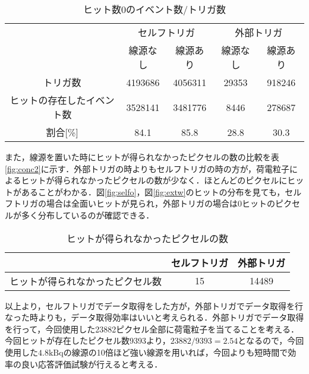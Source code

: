 \begin{table}[h]
  \centering
  \caption{ヒット数0のイベント数/トリガ数}
  \label{tab:conc1}
  \begin{tabular}{c|cc|cc} \hline
    & \multicolumn{2}{c|}{セルフトリガ} & \multicolumn{2}{c}{外部トリガ} \\
    & 線源なし & 線源あり & 線源なし & 線源あり \\ \hline
    トリガ数 & 4193686 & 4056311 & 29353 & 918246 \\
    ヒットの存在したイベント数 & 3528141 & 3481776 & 8446 & 278687 \\
    割合[\%] & 84.1 & 85.8 & 28.8 & 30.3 \\ \hline
  \end{tabular}
\end{table}

また，線源を置いた時にヒットが得られなかったピクセルの数の比較を表\ref{fig:conc2}に示す．外部トリガの時よりもセルフトリガの時の方が，荷電粒子によるヒットが得られなかったピクセルの数が少なく．ほとんどのピクセルにヒットがあることがわかる．図\ref{fig:selfo}，図\ref{fig:extw}のヒットの分布を見ても，セルフトリガの場合は全面いヒットが見られ，外部トリガの場合は0ヒットのピクセルが多く分布しているのが確認できる．

\begin{table}[h]
  \centering
  \caption{ヒットが得られなかったピクセルの数}
  \begin{tabular}{c|c|c} \hline
    & セルフトリガ & 外部トリガ \\ \hline
    ヒットが得られなかったピクセル数 & 15 & 14489 \\ \hline
  \end{tabular}
\end{table}

以上より，セルフトリガでデータ取得をした方が，外部トリガでデータ取得を行なった時よりも，データ取得効率はいいと考えられる．外部トリガでデータ取得を行って，今回使用した23882ピクセル全部に荷電粒子を当てることを考える．今回ヒットが存在したピクセル数9393より，$23882/9393 = 2.54$となるので，今回使用した$4.8 \mathrm{kBq}$の線源の10倍ほど強い線源を用いれば，今回よりも短時間で効率の良い応答評価試験が行えると考える．


